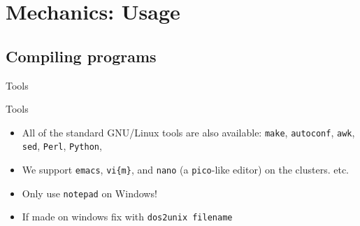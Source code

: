 \documentclass{beamer}
\begin{document}
  \section{Mechanics: Usage}
  \subsection{Compiling programs}
  \begin{frame}{Tools}
   \begin{block}{Tools}
    \begin{itemize}
    \item<1- > All of the standard GNU/Linux tools are also available: \texttt{make},
      \texttt{autoconf}, \texttt{awk}, \texttt{sed}, \texttt{Perl}, \texttt{Python},
    \item<2- > We support \texttt{emacs}, \texttt{vi\{m\}}, and \texttt{nano} (a 
      \texttt{pico}-like editor) on the clusters.
      etc.
    \item<3-| alert@1-> Only use \texttt{notepad} on Windows!
    \item<3-| alert@1-> If made on windows fix with \texttt{dos2unix filename}
    \end{itemize}
   \end{block}
  \end{frame}
\end{document}
